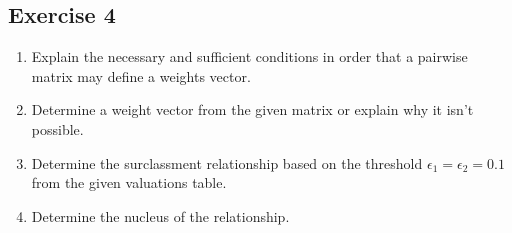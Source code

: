 \documentclass[\main/main.tex]{subfiles}
\begin{document}
\subsection{Exercise 4}


\begin{enumerate}
  \item Explain the necessary and sufficient conditions in order that a pairwise matrix may define a weights vector.
  \item Determine a weight vector from the given matrix or explain why it isn't possible.
  \item Determine the surclassment relationship based on the threshold $\epsilon_1=\epsilon_2=0.1$ from the given valuations table.
  \item Determine the nucleus of the relationship.
\end{enumerate}
\end{document}
